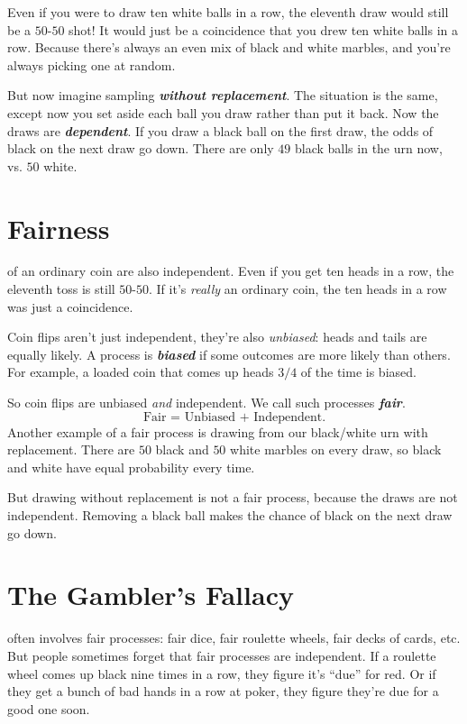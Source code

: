 \documentclass[justified]{tufte-book}
\theoremstyle{definition}
\theoremstyle{definition}
\theoremstyle{definition}
\theoremstyle{remark}
\begin{document}
Even if you were to draw ten white balls in a row, the eleventh draw would still be a \(50\)-\(50\) shot! It would just be a coincidence that you drew ten white balls in a row. Because there's always an even mix of black and white marbles, and you're always picking one at random.

But now imagine sampling \textbf{\emph{without replacement}}. The situation is the same, except now you set aside each ball you draw rather than put it back. Now the draws are \textbf{\emph{dependent}}. If you draw a black ball on the first draw, the odds of black on the next draw go down. There are only \(49\) black balls in the urn now, vs. \(50\) white.

\hypertarget{fairness}{%
\section{Fairness}\label{fairness}}

 of an ordinary coin are also independent. Even if you get ten heads in a row, the eleventh toss is still \(50\)-\(50\). If it's \emph{really} an ordinary coin, the ten heads in a row was just a coincidence.

Coin flips aren't just independent, they're also \emph{unbiased}: heads and tails are equally likely. A process is \textbf{\emph{biased}} if some outcomes are more likely than others. For example, a loaded coin that comes up heads \(3/4\) of the time is biased.

So coin flips are unbiased \emph{and} independent. We call such processes \textbf{\emph{fair}}.
\[ \mbox{Fair = Unbiased + Independent}.\]
Another example of a fair process is drawing from our black/white urn with replacement. There are \(50\) black and \(50\) white marbles on every draw, so black and white have equal probability every time.

But drawing without replacement is not a fair process, because the draws are not independent. Removing a black ball makes the chance of black on the next draw go down.

\hypertarget{the-gamblers-fallacy-1}{%
\section{The Gambler's Fallacy}\label{the-gamblers-fallacy-1}}

 often involves fair processes: fair dice, fair roulette wheels, fair decks of cards, etc. But people sometimes forget that fair processes are independent. If a roulette wheel comes up black nine times in a row, they figure it's ``due'' for red. Or if they get a bunch of bad hands in a row at poker, they figure they're due for a good one soon.
\end{document}
